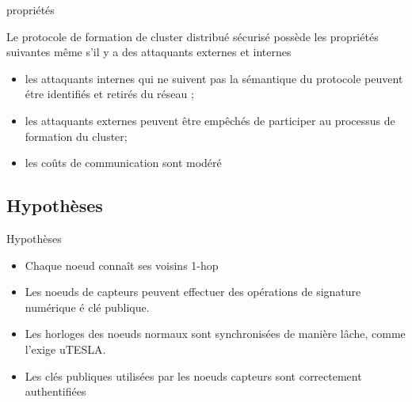 \documentclass[12pt, c]{beamer}
\begin{document}
			\begin{frame}{propriétés}
				\transwipe
					\vspace{-0.21cm}
						\begin{block}{\scriptsize Le protocole de formation de cluster distribué sécurisé possède les propriétés suivantes même s'il y a des attaquants externes et internes}
							\begin{itemize}
								\item[\ding{43}]les attaquants internes qui ne suivent pas la sémantique du protocole peuvent étre identifiés et retirés du réseau ;
								\item[\ding{43}] les attaquants externes peuvent être empêchés de participer au processus de formation du cluster;
								
								\item[\ding{43}]  les coûts de communication sont modéré
							\end{itemize}
						\end{block}
			\end{frame}
			\subsection{Hypothèses }
				\begin{frame}{Hypothèses }
					\transwipe
					\vspace{-0.21cm}
					\begin{block}{}
							\begin{itemize}
								\item[\ding{43}]Chaque 	\tiny{noeud} connaît ses voisins 1-hop
								\item[\ding{43}]Les noeuds de capteurs peuvent effectuer des opérations de signature numérique é clé publique.

								\item[\ding{43}]Les horloges des noeuds normaux sont synchronisées de manière lâche, comme l'exige uTESLA.
								\item[\ding{43}]Les clés publiques utilisées par les noeuds capteurs sont correctement authentifiées
 
							\end{itemize}
					
					\end{block}
				\end{frame}
\end{document}
